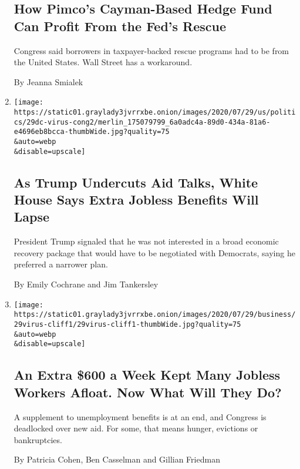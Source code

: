 \begin{enumerate}
{  \subsection{How Pimco's Cayman-Based Hedge Fund Can Profit From the
  Fed's
  Rescue}\label{how-pimcos-cayman-based-hedge-fund-can-profit-from-the-feds-rescue}}

  Congress said borrowers in taxpayer-backed rescue programs had to be
  from the United States. Wall Street has a workaround.

  By Jeanna Smialek
\item
  \href{/2020/07/29/business/economy/virus-aid-trump.html}{}

  \texttt{[image: https://static01.graylady3jvrrxbe.onion/images/2020/07/29/us/politics/29dc-virus-cong2/merlin\_175079799\_6a0adc4a-89d0-434a-81a6-e4696eb8bcca-thumbWide.jpg?quality=75\\\&auto=webp\\\&disable=upscale]}

  \hypertarget{as-trump-undercuts-aid-talks-white-house-says-extra-jobless-benefits-will-lapse}{%
  \subsection{As Trump Undercuts Aid Talks, White House Says Extra
  Jobless Benefits Will
  Lapse}\label{as-trump-undercuts-aid-talks-white-house-says-extra-jobless-benefits-will-lapse}}

  President Trump signaled that he was not interested in a broad
  economic recovery package that would have to be negotiated with
  Democrats, saying he preferred a narrower plan.

  By Emily Cochrane and Jim Tankersley
\item
  \href{/2020/07/29/business/economy/unemployment-benefits-coronavirus.html}{}

  \texttt{[image: https://static01.graylady3jvrrxbe.onion/images/2020/07/29/business/29virus-cliff1/29virus-cliff1-thumbWide.jpg?quality=75\\\&auto=webp\\\&disable=upscale]}

  \hypertarget{an-extra-600-a-week-kept-many-jobless-workers-afloat-now-what-will-they-do}{%
  \subsection{An Extra \$600 a Week Kept Many Jobless Workers Afloat.
  Now What Will They
  Do?}\label{an-extra-600-a-week-kept-many-jobless-workers-afloat-now-what-will-they-do}}

  A supplement to unemployment benefits is at an end, and Congress is
  deadlocked over new aid. For some, that means hunger, evictions or
  bankruptcies.

  By Patricia Cohen, Ben Casselman and Gillian Friedman
\end{enumerate}

